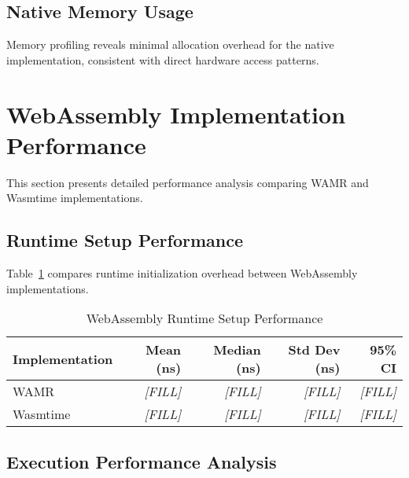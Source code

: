 \subsection{Native Memory Usage}
\label{subsec:native-memory}

Memory profiling reveals minimal allocation overhead for the native implementation, consistent with direct hardware access patterns.

\section{WebAssembly Implementation Performance}
\label{sec:wasm-performance}

This section presents detailed performance analysis comparing WAMR and Wasmtime implementations.

\subsection{Runtime Setup Performance}
\label{subsec:setup-performance}

Table~\ref{tab:setup-performance} compares runtime initialization overhead between WebAssembly implementations.

\begin{table}[htbp]
\centering
\caption{WebAssembly Runtime Setup Performance}
\label{tab:setup-performance}
\begin{tabular}{lrrrr}
\toprule
\textbf{Implementation} & \textbf{Mean (ns)} & \textbf{Median (ns)} & \textbf{Std Dev (ns)} & \textbf{95\% CI} \\
\midrule
WAMR          & \textit{[FILL]} & \textit{[FILL]} & \textit{[FILL]} & \textit{[FILL]} \\
Wasmtime      & \textit{[FILL]} & \textit{[FILL]} & \textit{[FILL]} & \textit{[FILL]} \\
\bottomrule
\end{tabular}
\end{table}


\subsection{Execution Performance Analysis}
\label{subsec:execution-performance}

